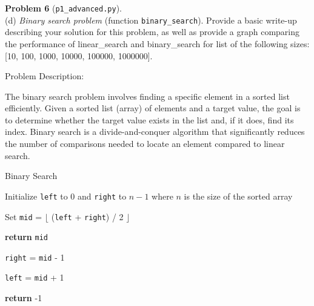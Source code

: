\documentclass{hw}
\begin{document}
\newcommand{\rank}{\textnormal{rank}}
\newcommand{\Colon}{:}
\newcommand{\dotdot}{..}
\newcommand{\numinv}{\textrm{NI}}
\newcommand{\numlargeinv}{\textrm{NLI}}


\textbf{Problem 6} (\texttt{p1\_advanced.py}).\\ 
(d) \textit{Binary search problem} (function \texttt{binary\_search}). Provide a basic write-up describing your solution for this problem, as well as provide a graph comparing the performance of linear\_search and binary\_search for list of the following sizes: [10, 100, 1000, 10000, 100000, 1000000].

\begin{solution}
Problem Description:

The binary search problem involves finding a specific element in a sorted list efficiently. Given a sorted list (array) of elements and a target value, the goal is to determine whether the target value exists in the list and, if it does, find its index. Binary search is a divide-and-conquer algorithm that significantly reduces the number of comparisons needed to locate an element compared to linear search.

\begin{algorithm}
\caption{Binary Search}

\begin{algorithmic}[1]

\STATE Initialize \texttt{left} to 0 and \texttt{right} to $n - 1$ where $n$ is the size of the sorted array


\STATE Set \texttt{mid} = $\lfloor$ (\texttt{left} + \texttt{right}) / 2 $\rfloor$


\STATE \textbf{return} \texttt{mid}


\STATE \texttt{right} = \texttt{mid} - 1

\ELSE

\STATE \texttt{left} = \texttt{mid} + 1

\ENDIF

\ENDWHILE

\STATE \textbf{return} -1 

\end{algorithmic}


\end{algorithm}
\end{solution}
\end{document}
